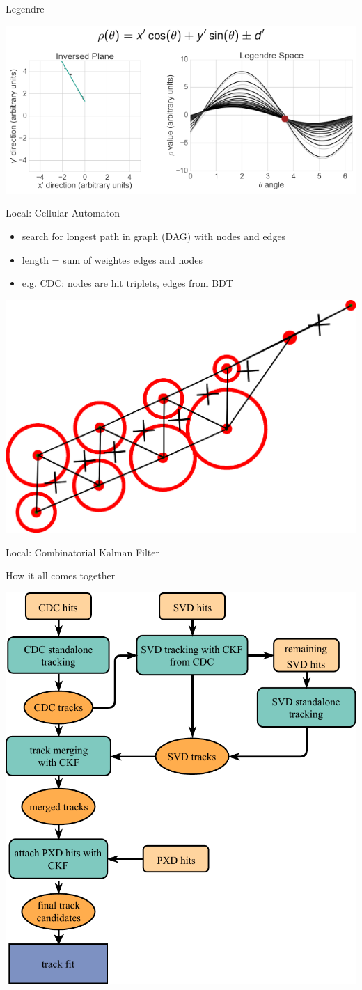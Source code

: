 \documentclass[presentation]{etp-beamer-fancy}
\begin{document}
\begin{frame}[label={sec:org45f75a9}]{Legendre}
\begin{center}
\includegraphics[width=.7\textwidth]{./figures/legendre_transform.png}
\end{center}
\end{frame}

\begin{frame}[label={sec:orgac0e8be}]{Local: Cellular Automaton}
\begin{itemize}
\item search for longest path in graph (DAG) with nodes and edges
\item length = sum of weightes edges and nodes
\item e.g. CDC: nodes are hit triplets, edges from BDT
\end{itemize}
\begin{center}
\includegraphics[width=.5\textwidth]{./figures/segment_from_triplets.png}
\end{center}
\end{frame}
\begin{frame}[label={sec:org072bfae}]{Local: Combinatorial Kalman Filter}
\end{frame}
\begin{frame}[label={sec:orgf12a813}]{How it all comes together}
\begin{center}
\includegraphics[width=.55\textwidth]{./figures/full_track_finding_simplified.pdf}
\end{center}
\end{frame}
\end{document}
